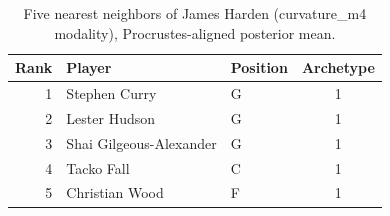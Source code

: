\begin{table}[htbp]
  \centering\small
  \begin{tabular}{rllc}
    \toprule
    Rank & Player & Position & Archetype \\
    \midrule
    1 & Stephen Curry & G & 1 \\
    2 & Lester Hudson & G & 1 \\
    3 & Shai Gilgeous-Alexander & G & 1 \\
    4 & Tacko Fall & C & 1 \\
    5 & Christian Wood & F & 1 \\
    \bottomrule
  \end{tabular}
  \caption{Five nearest neighbors of James Harden (curvature_m4 modality), Procrustes-aligned posterior mean.}
  \label{tab:James_Harden_neighbors_curvature_m4}
\end{table}

